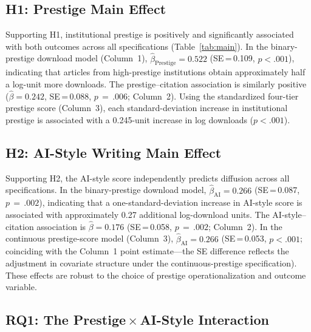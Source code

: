 \documentclass[12pt,a4paper]{article}
\begin{document}
\subsection{H1: Prestige Main Effect}

Supporting H1, institutional prestige is positively and significantly
associated with both outcomes across all specifications
(Table~\ref{tab:main}).
In the binary-prestige download model (Column~1),
$\hat{\beta}_{\text{Prestige}} = 0.522$ (SE\,=\,0.109, $p<.001$),
indicating that articles from high-prestige institutions obtain
approximately half a log-unit more downloads.
The prestige--citation association is similarly positive
($\hat{\beta} = 0.242$, SE\,=\,0.088, $p\,=\,.006$; Column~2).
Using the standardized four-tier prestige score (Column~3), each
standard-deviation increase in institutional prestige is associated
with a 0.245-unit increase in log downloads ($p<.001$).

\subsection{H2: AI-Style Writing Main Effect}

Supporting H2, the AI-style score independently predicts diffusion
across all specifications.
In the binary-prestige download model,
$\hat{\beta}_{\text{AI}} = 0.266$ (SE\,=\,0.087, $p\,=\,.002$),
indicating that a one-standard-deviation increase in AI-style score
is associated with approximately 0.27 additional log-download units.
The AI-style--citation association is
$\hat{\beta} = 0.176$ (SE\,=\,0.058, $p\,=\,.002$; Column~2).
In the continuous prestige-score model (Column~3),
$\hat{\beta}_{\text{AI}} = 0.266$ (SE\,=\,0.053, $p<.001$;
coinciding with the Column~1 point estimate---the SE difference reflects
the adjustment in covariate structure under the continuous-prestige
specification).
These effects are robust to the choice of prestige operationalization
and outcome variable.

\subsection{RQ1: The Prestige\,$\times$\,AI-Style Interaction}
\end{document}
